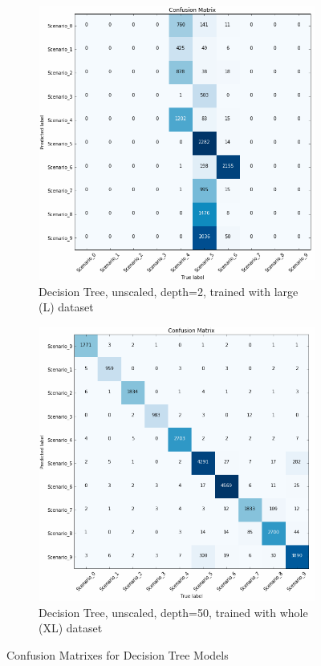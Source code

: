 \begin{figure}[!htb]
    \captionsetup[subfigure]{justification=centering}
    \centering
    \begin{subfigure}[htb]{0.49\textwidth}
        \centering
        \includegraphics[width=\linewidth]{figures/dtc_unscaled_L_2}
        \caption{Decision Tree, unscaled, depth=2, trained with large (L) dataset}
        \label{fig:knn_2}
    \end{subfigure}
    \begin{subfigure}[htb]{0.49\textwidth}
        \centering
        \includegraphics[width=\linewidth]{figures/dtc_unscaled_XL_50}
        \caption{Decision Tree, unscaled, depth=50, trained with whole (XL) dataset}
        \label{fig:knn_4}
    \end{subfigure}
    \caption{Confusion Matrixes for Decision Tree Models}
    \label{fig:confusiondtc}
\end{figure}
